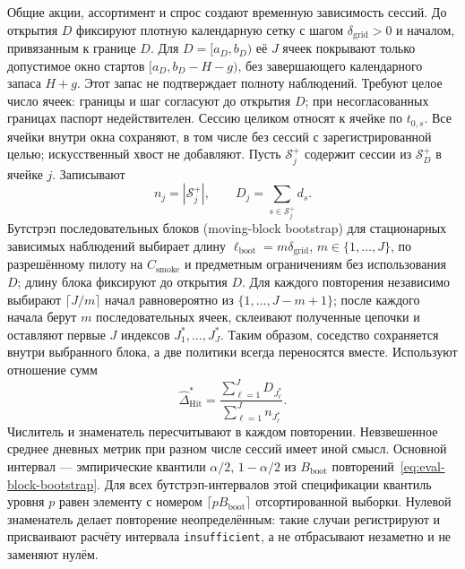 \documentclass[12pt,a4paper]{article}
\theoremstyle{plainru}
\begin{document}
Общие акции, ассортимент и спрос создают временную зависимость сессий.
До открытия $D$ фиксируют плотную календарную сетку с шагом
$\delta_{\mathrm{grid}}>0$ и началом, привязанным к границе $D$.
Для $D=[a_D,b_D)$ её $J$ ячеек покрывают только допустимое окно
стартов $[a_D,b_D-H-g)$, без завершающего календарного запаса $H+g$.
Этот запас не подтверждает полноту наблюдений.
Требуют целое число ячеек: границы и шаг согласуют до открытия $D$;
при несогласованных границах паспорт недействителен.
Сессию целиком относят к ячейке по $t_{0,s}$. Все ячейки внутри окна
сохраняют, в том числе без сессий с зарегистрированной целью;
искусственный хвост не добавляют. Пусть $\mathcal S_j^+$ содержит сессии
из $\mathcal S_D^+$ в ячейке $j$. Записывают
\begin{equation}\label{eq:eval-block-stat}
 n_j=|\mathcal S_j^+|,\qquad D_j=\sum_{s\in\mathcal S_j^+}d_s.
\end{equation}
Бутстрэп последовательных блоков (moving-block bootstrap)
для стационарных зависимых наблюдений
\cite{kunsch1989} выбирает длину
$\ell_{\mathrm{boot}}=m\delta_{\mathrm{grid}}$, $m\in\{1,\ldots,J\}$,
по разрешённому пилоту на $C_{\mathrm{smoke}}$ и предметным ограничениям
без использования $D$; длину блока фиксируют до открытия $D$.
Для каждого повторения независимо выбирают
$\lceil J/m\rceil$ начал равновероятно из $\{1,\ldots,J-m+1\}$;
после каждого начала берут $m$ последовательных ячеек, склеивают
полученные цепочки и оставляют первые $J$ индексов
$J_1^*,\ldots,J_J^*$. Таким образом, соседство сохраняется внутри
выбранного блока, а две политики всегда переносятся вместе.
Используют отношение сумм
\begin{equation}\label{eq:eval-block-bootstrap}
 \widehat\Delta_{\mathrm{Hit}}^*
 =\frac{\sum_{\ell=1}^{J}D_{J_\ell^*}}
              {\sum_{\ell=1}^{J}n_{J_\ell^*}}.
\end{equation}
Числитель и знаменатель пересчитывают в каждом повторении.
Невзвешенное среднее дневных метрик при разном числе сессий имеет иной смысл.
Основной интервал --- эмпирические квантили $\alpha/2$, $1-\alpha/2$
из $B_{\mathrm{boot}}$ повторений~\eqref{eq:eval-block-bootstrap}.
Для всех бутстрэп-интервалов этой спецификации квантиль уровня $p$
равен элементу с номером
$\lceil pB_{\mathrm{boot}}\rceil$ отсортированной выборки.
Нулевой знаменатель делает повторение неопределённым: такие случаи
регистрируют и присваивают расчёту интервала \texttt{insufficient},
а не отбрасывают незаметно и не заменяют нулём.
\end{document}
